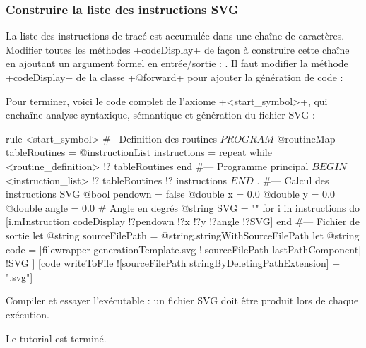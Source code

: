 \subsubsection{Construire la liste des instructions SVG}
La liste des instructions de tracé est accumulée dans une chaîne de caractères. Modifier toutes les méthodes \ggs+codeDisplay+ de façon à construire cette chaîne en ajoutant un argument formel en entrée/sortie : . Il faut modifier la méthode \ggs+codeDisplay+ de la classe \ggs+@forward+ pour ajouter la génération de code :


Pour terminer, voici le code complet de l’axiome \ggs+<start_symbol>+, qui enchaîne analyse syntaxique, sémantique et génération du fichier SVG :
\begin{galgas}
rule <start_symbol> {
#-- Definition des routines
  $PROGRAM$
  @routineMap tableRoutines = {}
  @instructionList instructions = {}
  repeat
  while
    <routine_definition> !? tableRoutines
  end
#--- Programme principal
  $BEGIN$
  <instruction_list> !? tableRoutines !? instructions
  $END$
  $.$
#--- Calcul des instructions SVG
  @bool pendown = false
  @double x = 0.0
  @double y = 0.0
  @double angle = 0.0 # Angle en degrés
  @string SVG = ""
  for i in instructions do
    [i.mInstruction codeDisplay !?pendown !?x !?y !?angle !?SVG]
  end
#--- Fichier de sortie
  let @string sourceFilePath = @string.stringWithSourceFilePath
  let @string code = [filewrapper generationTemplate.svg
    ![sourceFilePath lastPathComponent]
    !SVG
  ]
  [code writeToFile ![sourceFilePath stringByDeletingPathExtension] + ".svg"]
}
\end{galgas}

Compiler et essayer l'exécutable : un fichier SVG doit être produit lors de chaque exécution.

Le tutorial est terminé.
